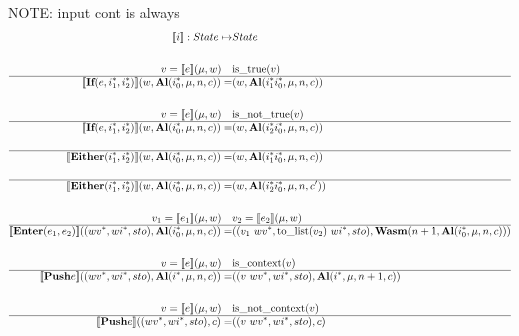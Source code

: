NOTE: input cont is always \al
\begin{align*}
  \sem{i} : State \mapsto& State \\
%
\newline \\
  v = \sem{e}(\mu, w) \quad& \text{is\_true}(v) \\
  \hline
  \sem{\textbf{If} (e, \seq{i_1}, \seq{i_2})}(w, \al (\seq{i_0}, \mu, n, c))
  =&
  (w, \al (\seq{i_1} \seq{i_0}, \mu, n, c)) \\
%
\newline \\
  v = \sem{e}(\mu, w) \quad& \text{is\_not\_true}(v) \\
  \hline
  \sem{\textbf{If} (e, \seq{i_1}, \seq{i_2})}(w, \al (\seq{i_0}, \mu, n, c))
  =&
  (w, \al (\seq{i_2} \seq{i_0}, \mu, n, c)) \\
%
\newline \\
  \hline
  \sem{\textbf{Either} (\seq{i_1}, \seq{i_2})}(w, \al (\seq{i_0}, \mu, n, c))
  =&
  (w, \al (\seq{i_1} \seq{i_0}, \mu, n, c)) \\
%
\newline \\
  \hline
  \sem{\textbf{Either} (\seq{i_1}, \seq{i_2})}(w, \al (\seq{i_0}, \mu, n, c))
  =&
  (w, \al (\seq{i_2} \seq{i_0}, \mu, n, c')) \\
%
\newline \\
  v_1 = \sem{e_1}(\mu, w) \quad& v_2 = \sem{e_2}(\mu, w) \\
  \hline
  \sem{\textbf{Enter} (e_1, e_2)}((\seq{wv}, \seq{wi}, sto), \al (\seq{i_0}, \mu, n, c))
  =&
  ((v_1 ~ \seq{wv}, \text{to\_list}(v_2) ~ \seq{wi}, sto), \wasm (n+1, \al (\seq{i_0}, \mu, n, c))) \\
%
\newline \\
  v = \sem{e}(\mu, w) \quad& \text{is\_context}(v) \\
  \hline
  \sem{\textbf{Push} e}((\seq{wv}, \seq{wi}, sto), \al(\seq i, \mu, n, c))
  =&
  ((v ~ \seq{wv}, \seq{wi}, sto), \al(\seq i, \mu, n+1, c)) \\
%
\newline \\
  v = \sem{e}(\mu, w) \quad& \text{is\_not\_context}(v) \\
  \hline
  \sem{\textbf{Push} e}((\seq{wv}, \seq{wi}, sto), c) =& ((v ~ \seq{wv}, \seq{wi}, sto), c) \\

\end{align*}
